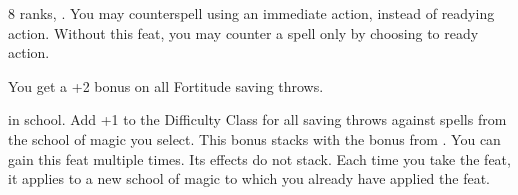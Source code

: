 





{}
{ 8 ranks, .}
{You may counterspell using an immediate action, instead of readying action.}
{Without this feat, you may counter a spell only by choosing to ready action.}
{}

{You get a +2 bonus on all Fortitude saving throws.}

{}{ in school.}
{Add +1 to the Difficulty Class for all saving throws against spells from the school of magic you select. This bonus stacks with the bonus from .}{}
{You can gain this feat multiple times. Its effects do not stack. Each time you take the feat, it applies to a new school of magic to which you already have applied the  feat.}{}

